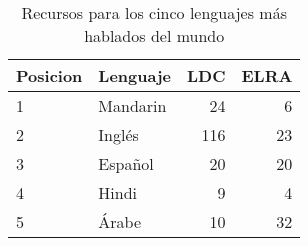 \begin{table}[H]
\centering
\caption{Recursos para los cinco lenguajes más hablados del mundo \cite{HernndezMena2017}}
\label{tab:resources_by_langauge}
\begin{tabular}{|l|l|r|r|} %
\hline
\textbf{Posicion} & \textbf{Lenguaje} & \textbf{LDC} & \textbf{ELRA} \\ \hline
1    & Mandarin & 24  & 6    \\ \hline
2    & Inglés  & 116 & 23   \\ \hline
3    & Español  & 20  & 20   \\ \hline
4    & Hindi    & 9   & 4    \\ \hline
5    & Árabe   & 10  & 32   \\ \hline
\end{tabular}
\end{table}
